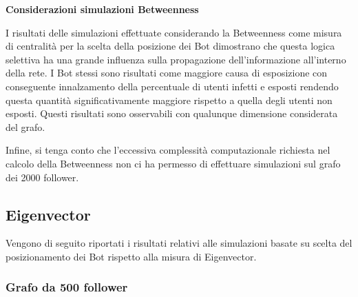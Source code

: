         
        \textbf{Considerazioni simulazioni Betweenness}
        
        I risultati delle simulazioni effettuate considerando la Betweenness come misura di centralità per la scelta della posizione dei Bot dimostrano che questa logica selettiva ha una grande influenza sulla propagazione dell'informazione all'interno della rete. I Bot stessi sono risultati come maggiore causa di esposizione con conseguente innalzamento della percentuale di utenti infetti e esposti rendendo questa quantità significativamente maggiore rispetto a quella degli utenti non esposti. Questi risultati sono osservabili con qualunque dimensione considerata del grafo. 
        
        Infine, si tenga conto che l’eccessiva complessità computazionale richiesta nel calcolo della Betweenness non ci ha permesso di effettuare simulazioni sul grafo dei 2000 follower.
    
        
    \subsection{Eigenvector}
        Vengono di seguito riportati i risultati relativi alle simulazioni basate su scelta del posizionamento dei Bot rispetto alla misura di Eigenvector.
        
        \subsubsection{Grafo da 500 follower}

